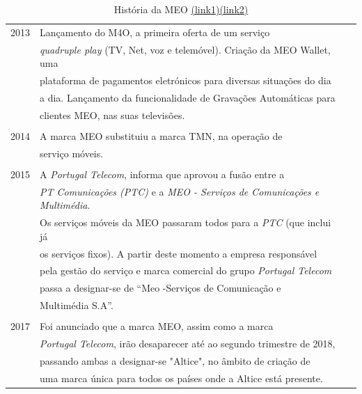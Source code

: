 \documentclass{report}
\begin{document}
\newpage

\begin{table}[h]
\centering
\vspace{0.5cm}
\begin{tabular}{r|lr}

2013 & Lançamento do M4O, a primeira oferta de um serviço\\
& \textit{quadruple play} (TV, Net, voz e telemóvel). Criação da MEO Wallet, uma\\
& plataforma de pagamentos eletrónicos para diversas situações do dia\\
& a dia. Lançamento da funcionalidade de Gravações Automáticas para\\
& clientes MEO, nas suas televisões.\\
&\\
2014 & A marca MEO substituiu a marca TMN, na operação de\\
& serviço móveis.\\
&\\
2015 & A \textit{Portugal Telecom}, informa que aprovou a fusão entre a\\
& \textit{PT Comunicações (PTC)} e a \textit{MEO - Serviços de Comunicações e Multimédia}.\\
& Os serviços móveis da MEO passaram todos para a \textit{PTC} (que inclui já\\
& os serviços fixos). A partir deste momento a empresa responsável\\
& pela gestão do serviço e marca comercial do grupo \textit{Portugal Telecom}\\
& passa a designar-se de “Meo -Serviços de Comunicação e\\
& Multimédia S.A”.\\
&\\
2017 & Foi anunciado que a marca MEO, assim como a marca\\
& \textit{Portugal Telecom}, irão desaparecer até ao segundo trimestre de 2018,\\
& passando ambas a designar-se "Altice", no âmbito de criação de\\
& uma marca única para todos os países onde a Altice está presente.\\

\end{tabular}
\caption{História da MEO \href{https://pt.wikipedia.org/wiki/Meo}{(link1)}\href{https://www.telecom.pt/pt-pt/a-pt/Paginas/historia.aspx}{(link2)}}
\end{table}
\end{document}
